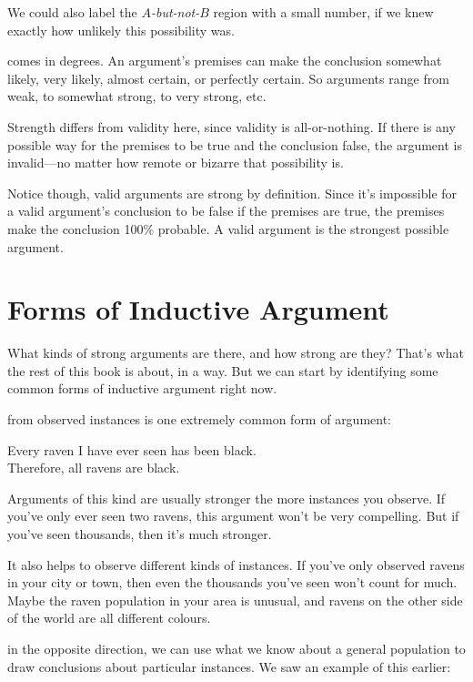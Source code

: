 \documentclass[justified]{tufte-book}
\theoremstyle{definition}
\theoremstyle{definition}
\theoremstyle{definition}
\theoremstyle{definition}
\theoremstyle{remark}
\begin{document}
We could also label the \emph{\(A\)-but-not-\(B\)} region with a small number, if we knew exactly how unlikely this possibility was.

 comes in degrees. An argument's premises can make the conclusion somewhat likely, very likely, almost certain, or perfectly certain. So arguments range from weak, to somewhat strong, to very strong, etc.

Strength differs from validity here, since validity is all-or-nothing. If there is any possible way for the premises to be true and the conclusion false, the argument is invalid---no matter how remote or bizarre that possibility is.

Notice though, valid arguments are strong by definition. Since it's impossible for a valid argument's conclusion to be false if the premises are true, the premises make the conclusion 100\% probable. A valid argument is the strongest possible argument.

\hypertarget{indargs}{%
\section{Forms of Inductive Argument}\label{indargs}}

What kinds of strong arguments are there, and how strong are they? That's what the rest of this book is about, in a way. But we can start by identifying some common forms of inductive argument right now.

 from observed instances is one extremely common form of argument:

\begin{argument}
Every raven I have ever seen has been black.\\
Therefore, all ravens are black.
\end{argument}

Arguments of this kind are usually stronger the more instances you observe. If you've only ever seen two ravens, this argument won't be very compelling. But if you've seen thousands, then it's much stronger.

It also helps to observe different kinds of instances. If you've only observed ravens in your city or town, then even the thousands you've seen won't count for much. Maybe the raven population in your area is unusual, and ravens on the other side of the world are all different colours.

 in the opposite direction, we can use what we know about a general population to draw conclusions about particular instances. We saw an example of this earlier:
\end{document}
